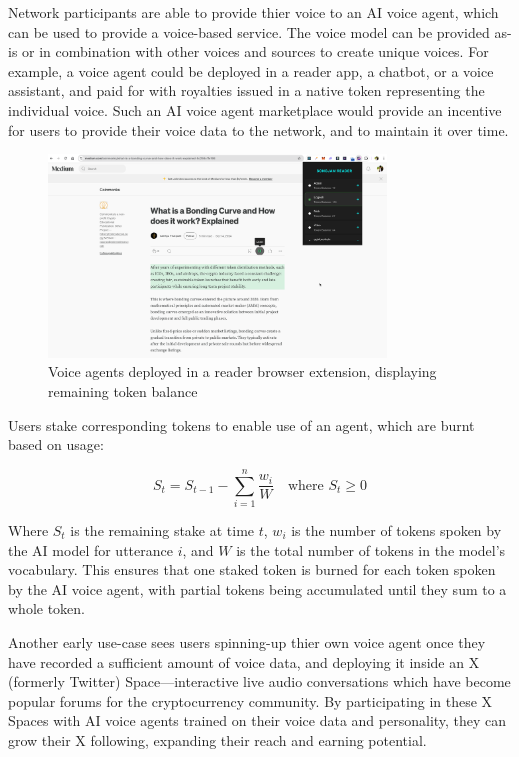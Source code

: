 \documentclass[11pt,a4paper]{article}
\begin{document}
Network participants are able to provide thier voice to an AI voice agent, which can be used to provide a voice-based service.
The voice model can be provided \textquotesingle as-is\textquotesingle{} or in combination with other voices and sources to create unique voices.
For example, a voice agent could be deployed in a reader app, a chatbot, or a voice assistant, and paid for with royalties issued in a native token representing the individual voice.
Such an AI voice agent marketplace would provide an incentive for users to provide their voice data to the network, and to maintain it over time.

\begin{figure}[H]
    \centering
    \includegraphics[width=0.8\textwidth]{reader.png}
    \caption{Voice agents deployed in a reader browser extension, displaying remaining token balance}
    \label{fig:reader}
\end{figure}

Users stake corresponding tokens to enable use of an agent, which are burnt based on usage:

\begin{equation}
    S_t = S_{t-1} - \sum_{i=1}^{n} \frac{w_i}{W} \quad \text{where } S_t \geq 0
\end{equation}

Where $S_t$ is the remaining stake at time $t$, $w_i$ is the number of tokens spoken by the AI model for utterance $i$, and $W$ is the total number of tokens in the model's vocabulary. This ensures that one staked token is burned for each token spoken by the AI voice agent, with partial tokens being accumulated until they sum to a whole token.

Another early use-case sees users spinning-up thier own voice agent once they have recorded a sufficient amount of voice data, and deploying it inside an X (formerly Twitter) Space---interactive live audio conversations which have become popular forums for the cryptocurrency community.
By participating in these X Spaces with AI voice agents trained on their voice data and personality, they can grow their X following, expanding their reach and earning potential.
\end{document}
